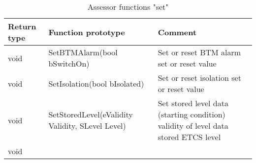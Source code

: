 \documentclass{template/openetcs_article}
\begin{document}
\begin{longtable}{|l|l|l|}
	\caption{Assessor functions "set"} \\ 
	\hline
		\begin{minipage}[t]{0.10\linewidth} \textbf{Return type} \end{minipage}
	&	\begin{minipage}[t]{0.50\linewidth} \textbf{Function prototype} \end{minipage} 
	&	\begin{minipage}[t]{0.45\linewidth} \textbf{Comment} \end{minipage} \\
	\hline
		\begin{minipage}[t]{0.10\linewidth} void \end{minipage} 
	&	\begin{minipage}[t]{0.50\linewidth} SetBTMAlarm(bool bSwitchOn) \end{minipage} 
	&	\begin{minipage}[t]{0.45\linewidth} Set or reset BTM alarm
	\newline [in] set or reset value \end{minipage} \\
	\hline
		\begin{minipage}[t]{0.10\linewidth} void \end{minipage} 
	&	\begin{minipage}[t]{0.50\linewidth} SetIsolation(bool bIsolated) \end{minipage} 
	&	\begin{minipage}[t]{0.45\linewidth} Set or reset isolation
	\newline [in] set or reset value \end{minipage} \\
	\hline
		\begin{minipage}[t]{0.10\linewidth} void \end{minipage} 
	&	\begin{minipage}[t]{0.50\linewidth} SetStoredLevel(eValidity Validity, SLevel Level) \end{minipage} 
	&	\begin{minipage}[t]{0.45\linewidth} Set stored level data (starting condition)
	\newline [in] validity of level data
	\newline [in] stored ETCS level \end{minipage} \\
	\hline
		\begin{minipage}[t]{0.10\linewidth} void \end{minipage} 

\end{longtable}
\end{document}
